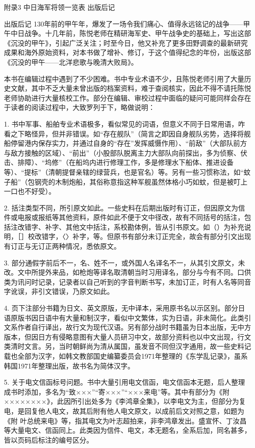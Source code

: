 \documentclass[12pt,UTF8]{ctexbook}
\begin{document}
附录3 中日海军将领一览表
出版后记

出版后记
130年前的甲午年，爆发了一场令我们痛心、值得永远铭记的战争——甲午中日战争。十几年前，陈悦老师在精研海军史、甲午战争史的基础上，写出这部《沉没的甲午》，引起广泛关注；时至今日，他又补充了更多田野调查的最新研究成果和海外原始资料，对本书做了增补、修订，于这个值得纪念的年份，出版这部《沉没的甲午——北洋悲歌与晚清大败局》。

本书在编辑过程中遇到了不少困难。书中专业术语不少，且陈悦老师引用了大量历史文献，其中不乏大量未曾出版的档案资料，难于查阅核实，因此不得不请托陈悦老师协助进行大量核校工作。部分在编辑、审校过程中面临的疑问可能同样会存在于读者的阅读过程中，大致罗列于下，略做说明：

1. 书中军事、船舶专业术语极多，看似常见的词语，但意义不同于日常用语，咋看之下略怪异，但并非错误。如“存在舰队”（简言之即因自身舰队劣势，选择将舰船停留港内保存实力，并通过自身的“存在”发挥威慑作用）、“前敌”（大部队前方与敌方接触的区域）、“前出”（小股部队脱离主力大部队向前探出，多为侦察、伏击、排障）、“坞修”（在船坞内进行修理工作，多是修理水下船体、推进设备等）、“提标”（清朝提督亲辖的绿营兵，也是官名）等。另有一些习惯称法，如“蚊子船”（包钢壳的木制炮船，其俗称意指这种军舰虽然体格小巧如蚊，但是被叮上一口也不好受）。

2. 括注类型不同，所引原文如此。一些史料在后期出版时有订正，但因原文为信件或电报或报纸等其他资料，原件如此不便于文中径改，故有不同括号的括注，包括注改错字、补字、其他文中括注，系校勘体例，皆从引书原文。如（）为补充说明，［］校改错字，〈〉补字，等。但原书有部分未订正完全，故会有部分引文出现有订正与无订正两种情况，悉依原文。

3. 部分通假字前后不一，名、姓不一，或外国人名译名不一，从其引文原文，未改。文中所提外来品，如枪炮等译名取清朝当时习用译名，部分与今有不同。口供类为讯问时记录，记录者以自己听到的字音判断书写，未加订正，时有人名等同音字讹误，非引文错误，乃原文如此。

4. 页下注部分书籍为日文、英文原版，无中译本，采用原书名以示区别。部分日语原版书因日语中有大量和制汉字，看似中文繁体，实为日语，非未简化。此类引文系作者自行译出，故行文为现代汉语。另有部分战时书籍虽为日本出版，无中方版本，但因日方有侵略意图有大量人员研习中文，故部分资料也以中文出现，行文类清时文言。另，当时朝鲜尚为清从属国，虽发音不同但汉字通用，故一些史料记载也全部为汉字，如韩文教部国史编纂委员会1971年整理的《东学乱记录》，虽系韩国1971年整理出版，故书名为简体汉字。

5. 关于电文信函标号问题。书中大量引用电文信函，电文信函本无题，后人整理成书时添加，多名为“致×××”“寄×××”“×××来电”等。其中有部分为《附××××××××》，此因所引出处多为《李鸿章全集》，以李电文为主，但部分为复电，是回复他人电文，故其后附有他人电文原文，以成前后文对照之意，如题为《附 叶总统来电》等，指其电文为叶志超拍来，非李鸿章发出。盛宣怀、丁汝昌等大量电文、信函同上。此类因为信件、电文，本无题名，全系后加，同名甚多，皆以页码后标注的编号区分。
\end{document}
